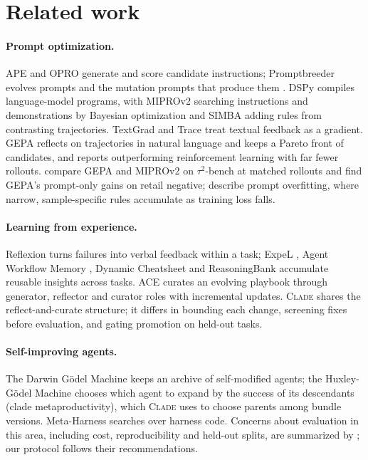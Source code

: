 \documentclass[11pt]{article}
\newcommand{\clade}{\textsc{Clade}\xspace}
\newcommand{\taub}{$\tau^2$-bench\xspace}
\begin{document}
\section{Related work}

\paragraph{Prompt optimization.} APE \citep{ape} and OPRO \citep{opro} generate and score candidate instructions;
Promptbreeder evolves prompts and the mutation prompts that produce them \citep{promptbreeder}. DSPy \citep{dspy}
compiles language-model programs, with MIPROv2 \citep{mipro} searching instructions and demonstrations by Bayesian
optimization and SIMBA \citep{simba} adding rules from contrasting trajectories. TextGrad \citep{textgrad} and Trace
\citep{trace} treat textual feedback as a gradient. GEPA \citep{gepa} reflects on trajectories in natural language and
keeps a Pareto front of candidates, and reports outperforming reinforcement learning with far fewer rollouts.
\citet{beyondprompts} compare GEPA and MIPROv2 on \taub at matched rollouts and find GEPA's prompt-only gains on
retail negative; \citet{textreg} describe prompt overfitting, where narrow, sample-specific rules accumulate as
training loss falls.

\paragraph{Learning from experience.} Reflexion \citep{reflexion} turns failures into verbal feedback within a task;
ExpeL \citep{expel}, Agent Workflow Memory \citep{awm}, Dynamic Cheatsheet \citep{dynamiccheatsheet} and
ReasoningBank \citep{reasoningbank} accumulate reusable insights across tasks. ACE \citep{ace} curates an evolving
playbook through generator, reflector and curator roles with incremental updates. \clade shares the
reflect-and-curate structure; it differs in bounding each change, screening fixes before evaluation, and gating
promotion on held-out tasks.

\paragraph{Self-improving agents.} The Darwin G\"odel Machine \citep{dgm} keeps an archive of self-modified agents;
the Huxley-G\"odel Machine \citep{hgm} chooses which agent to expand by the success of its descendants (clade
metaproductivity), which \clade uses to choose parents among bundle versions. Meta-Harness \citep{metaharness}
searches over harness code. Concerns about evaluation in this area, including cost, reproducibility and held-out
splits, are summarized by \citet{agentsthatmatter}; our protocol follows their recommendations.
\end{document}
